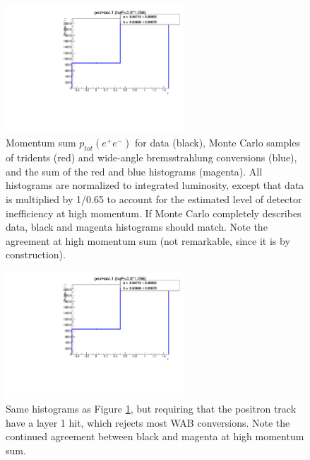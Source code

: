 \begin{figure}[ht]
\begin{center}
    \includegraphics[width=0.6\textwidth,page=22,angle=-90]{recon/figs/wabratioplots}
\end{center}
    \caption{Momentum sum $p_{tot}(e^+e^-)$ for data (black), Monte Carlo samples of tridents (red) and wide-angle bremsstrahlung conversions (blue), and the sum of the red and blue histograms (magenta).
    All histograms are normalized to integrated luminosity, except that data is multiplied by 1/0.65 to account for the estimated level of detector inefficiency at high momentum.
    If Monte Carlo completely describes data, black and magenta histograms should match.
    Note the agreement at high momentum sum (not remarkable, since it is by construction).
    }
    \label{fig:esum_allpairs}
\end{figure}

\begin{figure}[ht]
\begin{center}
    \includegraphics[width=0.6\textwidth,page=24,angle=-90]{recon/figs/wabratioplots}
\end{center}
    \caption{Same histograms as Figure \ref{fig:esum_allpairs}, but requiring that the positron track have a layer 1 hit, which rejects most WAB conversions.
    Note the continued agreement between black and magenta at high momentum sum.
    }
    \label{fig:esum_l1pos}
\end{figure}

